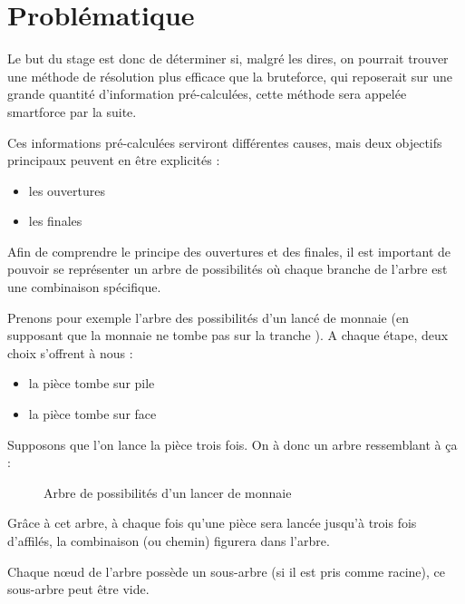 \section{Problématique}

	Le but du stage est donc de déterminer si, malgré les dires, on pourrait trouver une méthode de résolution plus efficace que la bruteforce, qui reposerait sur une grande quantité d'information pré-calculées, cette méthode sera appelée smartforce par la suite.

	Ces informations pré-calculées serviront différentes causes, mais deux objectifs principaux peuvent en être explicités :

	\begin{itemize}
		\item les ouvertures
		\item les finales
	\end{itemize}

	Afin de comprendre le principe des ouvertures et des finales, il est important de pouvoir se représenter un arbre de possibilités où chaque branche de l'arbre est une combinaison spécifique.

	\begin{exmp}
		Prenons pour exemple l'arbre des possibilités d'un lancé de monnaie (en supposant que la monnaie ne tombe pas sur la tranche \cite{murray1993probability}). A chaque étape, deux choix s'offrent à nous :
		\begin{itemize}
			\item la pièce tombe sur pile
			\item la pièce tombe sur face
		\end{itemize}

    Supposons que l'on lance la pièce trois fois. On à donc un arbre ressemblant à ça :

    \begin{figure}[H]
    	\begin{center}
    			
    	\end{center}
    \caption{Arbre de possibilités d'un lancer de monnaie}
    \label{fig:coin_tree}
    \end{figure}

    Grâce à cet arbre, à chaque fois qu'une pièce sera lancée jusqu'à trois fois d'affilés, la combinaison (ou chemin) figurera dans l'arbre.
    
    Chaque n\oe ud de l'arbre possède un sous-arbre (si il est pris comme racine), ce sous-arbre peut être vide.
	\end{exmp}
	
